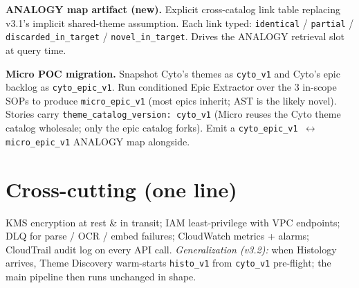 \documentclass[10.5pt,letterpaper]{article}
\begin{document}
\textbf{ANALOGY map artifact (new).} Explicit cross-catalog link table replacing v3.1's implicit shared-theme assumption. Each link typed: \texttt{identical} / \texttt{partial} / \texttt{discarded\_in\_target} / \texttt{novel\_in\_target}. Drives the ANALOGY retrieval slot at query time.

\textbf{Micro POC migration.} Snapshot Cyto's themes as \texttt{cyto\_v1} and Cyto's epic backlog as \texttt{cyto\_epic\_v1}. Run conditioned Epic Extractor over the 3 in-scope SOPs to produce \texttt{micro\_epic\_v1} (most epics inherit; AST is the likely novel). Stories carry \texttt{theme\_catalog\_version: cyto\_v1} (Micro reuses the Cyto theme catalog wholesale; only the epic catalog forks). Emit a \texttt{cyto\_epic\_v1 $\leftrightarrow$ micro\_epic\_v1} ANALOGY map alongside.

\section{Cross-cutting (one line)}

KMS encryption at rest \& in transit; IAM least-privilege with VPC endpoints; DLQ for parse / OCR / embed failures; CloudWatch metrics + alarms; CloudTrail audit log on every API call. \emph{Generalization (v3.2):} when Histology arrives, Theme Discovery warm-starts \texttt{histo\_v1} from \texttt{cyto\_v1} pre-flight; the main pipeline then runs unchanged in shape.
\end{document}
